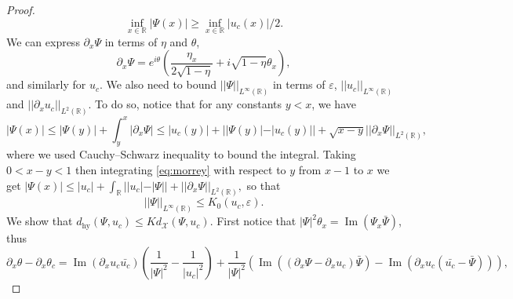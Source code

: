 \documentclass[11pt]{article}
\newcommand{\R}{\mathbb{R}}
\renewcommand{\Im}{\operatorname{Im}}
\theoremstyle{plain}
\theoremstyle{definition}
\theoremstyle{remark}
\numberwithin{equation}{section}
\begin{document}
{\begin{proof}
		\begin{equation}\label{eq:closinf}
			\inf_{x\in\R}|\Psi(x)|\geq \inf_{x\in\R}|u_c(x)|/2.
		\end{equation} We can express $\partial_x\Psi$ in terms of $\eta$ and $\theta$,
		\begin{equation}\label{eq:Psiprim}
			\partial_x\Psi=e^{i\theta}\left(\frac{\eta_x}{2\sqrt{1-\eta}}+i\sqrt{1-\eta}\theta_x\right),
		\end{equation} and similarly for $u_c$.
		We also need to bound $||\Psi||_{ L^\infty(\R)}$ in terms of $\varepsilon$, $||u_c||_{ L^\infty(\R)}$ and $||\partial_xu_c||_{ L^2(\R)}$. To do so, notice that for any constants $y<x$, we have
		\begin{equation}\label{eq:morrey}
			|\Psi(x)|\leq|\Psi(y)|+\int_{y}^x|\partial_x\Psi|\leq|u_c(y)|+||\Psi(y)|-|u_c(y)||+\sqrt{x-y}||\partial_x\Psi||_{ L^2(\R)},
		\end{equation} where we used Cauchy--Schwarz inequality to bound the integral. Taking $0<x-y<1$ then integrating \eqref{eq:morrey} with respect to $y$ from $x-1$ to $x$ we get
		$|\Psi(x)|\leq |u_c|+\int_{\R}||u_c|-|\Psi||+||\partial_x\Psi||_{ L^2(\R)},$
		so that
		\begin{equation}\label{eq:inftybound}
			||\Psi||_{ L^\infty(\R)}\leq K_0(u_c,\varepsilon).
		\end{equation} 
		We show that $d_{\mathrm{hy}}(\Psi,u_{c})\leq Kd_\mathcal{X}(\Psi,u_c).$ 
		First notice that $|\Psi|^2\theta_x=\Im(\Psi_x\bar{\Psi})$, thus
		$$\partial_x\theta-\partial_x\theta_c=\Im(\partial_xu_c\bar{u_c})\left(\frac{1}{|\Psi|^2}-\frac{1}{|u_c|^2}\right)+\frac{1}{|\Psi|^2}(\Im((\partial_x\Psi-\partial_xu_c)\bar{\Psi})-\Im(\partial_xu_c(\bar{u_c}-\bar{\Psi}))),$$
		

\end{proof}}
\end{document}
